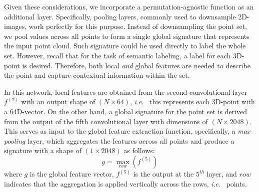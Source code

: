 \documentclass[final,3p,times,twocolumn,authoryear]{elsarticle}
\newcommand{\ie}{\textit{i}.\textit{e}.}
\begin{document}
Given these considerations, we incorporate a permutation-agnostic function as an additional layer.
Specifically, pooling layers, commonly used to downsample 2D-images, work perfectly for this purpose. 
Instead of downsampling the point set, we pool values across all points to form a single global signature that represents the input point cloud. 
Such signature could be used directly to label the whole set. 
However, recall that for the task of semantic labeling, a label for each 3D-point is desired. 
Therefore, both local \emph{and} global features are needed to describe the point  and capture contextual information within the set. 

In this network, local features are obtained from the second convolutional layer $f^{(2)}$ with an output shape of $(N\times64)$, \ie~ this represents each 3D-point with a 64D-vector. 
On the other hand, a global signature for the point set is derived from the output of the fifth convolutional layer with dimensions of $(N\times2048)$.
This serves as input to the global feature extraction function, specifically, a {\it max-pooling} layer, which aggregates the features across all points and produce a signature with a shape of $(1\times2048)$ as follows:
\begin{equation}
\label{eq:5}
g = \max_{row}(f^{(5)})
\end{equation}
where $g$ is the global feature vector, $f^{(5)}$ is the output at the $5^{th}$ layer, and $row$ indicates that the aggregation is applied vertically across the rows, \ie~ points. 
\end{document}
